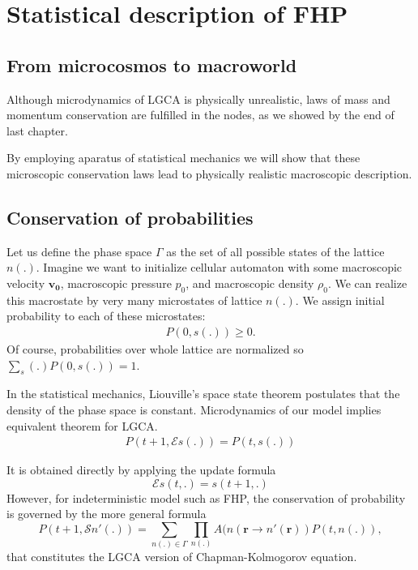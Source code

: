 \chapter{Statistical description of FHP}

\section{From microcosmos to macroworld}

Although microdynamics of LGCA is physically unrealistic, laws of mass and momentum conservation are fulfilled in the nodes, as we showed by the end of last chapter.

By employing aparatus of statistical mechanics we will show that these microscopic conservation laws lead to physically realistic macroscopic description.


\section{Conservation of probabilities}
Let us define the phase space $\Gamma$ as the set of all possible states of the lattice $n(.)$.
Imagine we want to initialize cellular automaton with some macroscopic velocity $\bm{v_0}$, macroscopic pressure $p_0$, and macroscopic density $\rho_0$.
We can realize this macrostate by very many microstates of lattice $n(.)$.
We assign initial probability to each of these microstates: 
\begin{align}
P(0,s(.)) \geq 0.
\end{align}
Of course, probabilities over whole lattice are normalized so
$\sum_s(.) P(0,s(.)) = 1$.


In the statistical mechanics, Liouville's space state theorem postulates that the density of the phase space is constant. Microdynamics of our model implies equivalent theorem for LGCA.
\begin{align}
P(t+1, \mathcal{E} s(.)) = P(t, s(.))
\end{align}

It is obtained directly by applying the update formula
\begin{equation}
\mathcal{E} s(t,.) = s(t+1,.)
\end{equation}
However, for indeterministic model such as FHP, the conservation of probability is governed by the more general formula
\begin{equation}
P(t+1,\mathcal{S} n'(.)) = \sum_{n(.) \in \Gamma} \prod_{n(.)} A(n(\bm{r} \rightarrow n'(\bm{r})) P(t, n(.)),
\end{equation}
that constitutes the LGCA version of Chapman-Kolmogorov equation.

